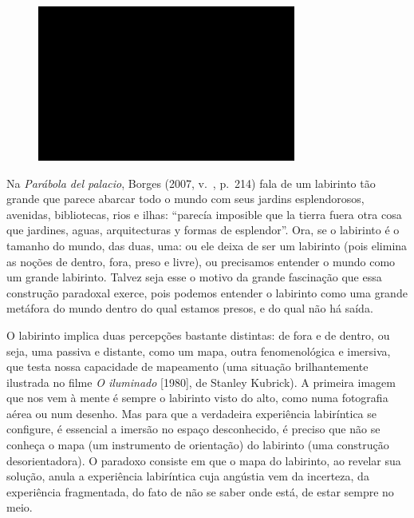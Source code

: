 \begin{figure}[!ht]

\centering
 \includegraphics[width=85mm]{./imgs/im1.jpg}
\caption{\tiny{}}

\end{figure}

Na \emph{Parábola del palacio}, Borges (2007, v.~, p.~214) fala de um
labirinto tão grande que parece abarcar todo o mundo com seus jardins
esplendorosos, avenidas, bibliotecas, rios e ilhas: ``parecía imposible
que la tierra fuera otra cosa que jardines, aguas, arquitecturas y
formas de esplendor''. Ora, se o labirinto é o tamanho do mundo, das
duas, uma: ou ele deixa de ser um labirinto (pois elimina as noções de
dentro, fora, preso e livre), ou precisamos entender o mundo como um
grande labirinto. Talvez seja esse o motivo da grande fascinação que
essa construção paradoxal exerce, pois podemos entender o labirinto como
uma grande metáfora do mundo dentro do qual estamos presos, e do qual
não há saída.

O labirinto implica duas percepções bastante distintas: de fora e de
dentro, ou seja, uma passiva e distante, como um mapa, outra
fenomenológica e imersiva, que testa nossa capacidade de mapeamento (uma
situação brilhantemente ilustrada no filme \emph{O iluminado} [1980], de
Stanley Kubrick). A primeira imagem que nos vem à mente é sempre o
labirinto visto do alto, como numa fotografia aérea ou num desenho. Mas
para que a verdadeira experiência labiríntica se configure, é essencial
a imersão no espaço desconhecido, é preciso que não se conheça o mapa
(um instrumento de orientação) do labirinto (uma construção
desorientadora). O paradoxo consiste em que o mapa do labirinto, ao
revelar sua solução, anula a experiência labiríntica cuja angústia vem
da incerteza, da experiência fragmentada, do fato de não se saber onde
está, de estar sempre no meio.

